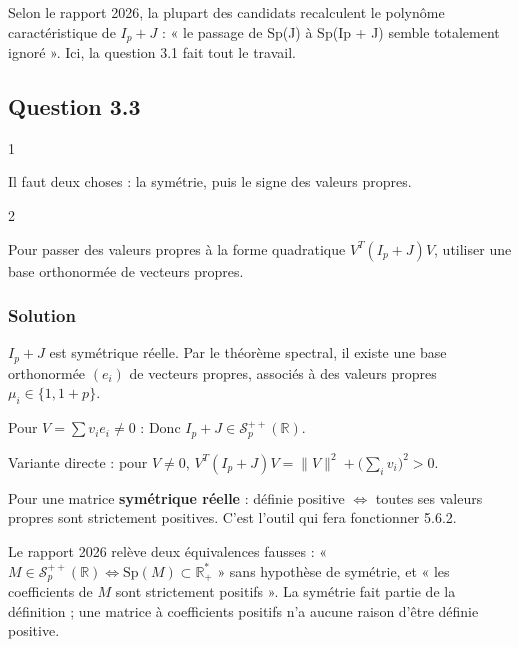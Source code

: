 \documentclass[11pt,a4paper]{article}
\newcommand{\equationajustee}[1]{%
  \sbox{\boiteequation}{$\displaystyle #1$}%
  \ifdim\wd\boiteequation>\linewidth
    \[\resizebox{\linewidth}{!}{\usebox{\boiteequation}}\]%
  \else
    \[#1\]%
  \fi}
\begin{document}
\begin{jury}

Selon le rapport 2026, la plupart des candidats recalculent le polynôme caractéristique de \(I_p+J\) : « le passage de Sp(J) à Sp(Ip + J) semble totalement ignoré ». Ici, la question 3.1 fait tout le travail.

\end{jury}

\hypertarget{question-3.3}{%
\subsection{Question 3.3}\label{question-3.3}}

\begin{indication}{1}

Il faut deux choses : la symétrie, puis le signe des valeurs propres.

\end{indication}

\begin{indication}{2}

Pour passer des valeurs propres à la forme quadratique \(V^T(I_p+J)V\), utiliser une base orthonormée de vecteurs propres.

\end{indication}

\hypertarget{solution-4}{%
\subsubsection{Solution}\label{solution-4}}

\(I_p+J\) est symétrique réelle. Par le théorème spectral, il existe une base orthonormée \((e_i)\) de vecteurs propres, associés à des valeurs propres \(\mu_i\in\{1,1+p\}\).

Pour \(V=\sum v_ie_i\ne0\) :
\equationajustee{V^T(I_p+J)V=\sum_i\mu_iv_i^2>0.}
Donc \(I_p+J\in\mathcal S_p^{++}(\mathbb R)\).

Variante directe : pour \(V\neq0\), \(V^T(I_p+J)V=\|V\|^2+\big(\sum_iv_i\big)^2>0\).

\begin{methode}

Pour une matrice \textbf{symétrique réelle} : définie positive \(\iff\) toutes ses valeurs propres sont strictement positives. C'est l'outil qui fera fonctionner 5.6.2.

\end{methode}

\begin{piege}

Le rapport 2026 relève deux équivalences fausses : « \(M\in\mathcal S_p^{++}(\mathbb R)\iff\mathrm{Sp}(M)\subset\mathbb R_+^*\) » sans hypothèse de symétrie, et « les coefficients de \(M\) sont strictement positifs ». La symétrie fait partie de la définition ; une matrice à coefficients positifs n'a aucune raison d'être définie positive.

\end{piege}
\end{document}

